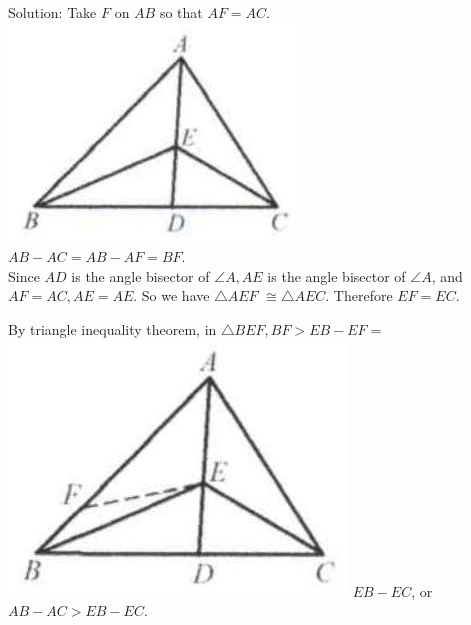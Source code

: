 \documentclass[10pt]{article}
\begin{document}
Solution:
Take \(F\) on \(A B\) so that \(A F=A C\).\\
\includegraphics[max width=\textwidth, center]{2025_04_17_97bc1f7e44d93c271a88g-057(2)}\\
\(A B-A C=A B-A F=B F\).\\
Since \(A D\) is the angle bisector of \(\angle A, A E\) is the angle bisector of \(\angle A\), and \(A F=A C, A E=A E\). So we have \(\triangle A E F\) \(\cong \triangle A E C\). Therefore \(E F=E C\).

By triangle inequality theorem, in \(\triangle B E F, B F>E B-E F=\)\\
\includegraphics[max width=\textwidth]{2025_04_17_97bc1f7e44d93c271a88g-057(1)} \(E B-E C\), or \(A B-A C>E B-E C\).
\end{document}
